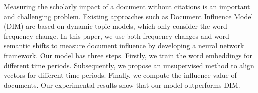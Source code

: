 Measuring the scholarly impact of a document without citations is an important and challenging problem. Existing approaches such as Document Influence Model (DIM) are based on dynamic topic models, which only consider the word frequency change. In this paper, we use both frequency changes and word semantic shifts to measure document influence by developing a neural network framework. Our model has three steps. Firstly, we train the word embeddings for different time periods. Subsequently, we propose an unsupervised method to align vectors for different time periods. Finally, we compute the influence value of documents. Our experimental results show that our model outperforms DIM.
